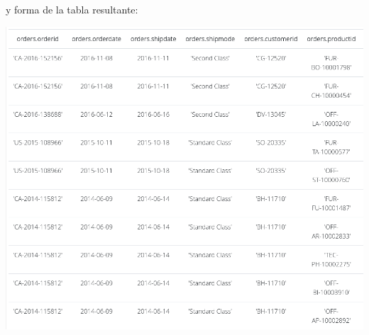 y forma de la tabla resultante: \\
\begin{center}
    \includegraphics[width=14cm]{resources/pregunta2/3.2.3.png} \\
\end{center}